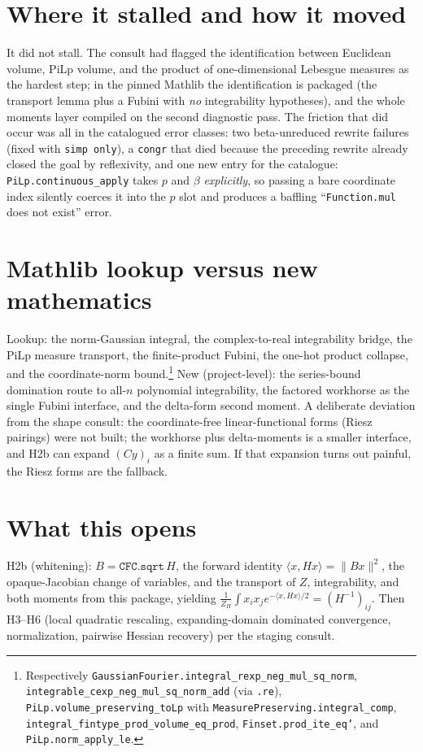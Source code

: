 \documentclass[11pt]{article}
\begin{document}
\section{Where it stalled and how it moved}

It did not stall. The consult had flagged the identification between
Euclidean volume, PiLp volume, and the product of one-dimensional
Lebesgue measures as the hardest step; in the pinned Mathlib the
identification is packaged (the transport lemma plus a Fubini with
\emph{no} integrability hypotheses), and the whole moments layer
compiled on the second diagnostic pass. The friction that did occur
was all in the catalogued error classes: two beta-unreduced rewrite
failures (fixed with \texttt{simp only}), a \texttt{congr} that died
because the preceding rewrite already closed the goal by
reflexivity, and one new entry for the catalogue:
\texttt{PiLp.continuous\_apply} takes $p$ and $\beta$
\emph{explicitly}, so passing a bare coordinate index silently
coerces it into the $p$ slot and produces a baffling
``\texttt{Function.mul} does not exist'' error.

\section{Mathlib lookup versus new mathematics}

Lookup: the norm-Gaussian integral, the complex-to-real integrability
bridge, the PiLp measure transport, the finite-product Fubini, the
one-hot product collapse, and the coordinate-norm
bound.\footnote{Respectively
\texttt{GaussianFourier.integral\_rexp\_neg\_mul\_sq\_norm},
\texttt{integrable\_cexp\_neg\_mul\_sq\_norm\_add} (via \texttt{.re}),
\texttt{PiLp.volume\_preserving\_toLp} with
\texttt{MeasurePreserving.integral\_comp},
\texttt{integral\_fintype\_prod\_volume\_eq\_prod},
\texttt{Finset.prod\_ite\_eq'}, and \texttt{PiLp.norm\_apply\_le}.}
New (project-level): the series-bound
domination route to all-$n$ polynomial integrability, the factored
workhorse as the single Fubini interface, and the delta-form second
moment. A deliberate deviation from the shape consult: the
coordinate-free linear-functional forms (Riesz pairings) were not
built; the workhorse plus delta-moments is a smaller interface, and
H2b can expand $(Cy)_i$ as a finite sum. If that expansion turns out
painful, the Riesz forms are the fallback.

\section{What this opens}

H2b (whitening): $B = \texttt{CFC.sqrt}\,H$, the forward identity
$\langle x, Hx\rangle = \|Bx\|^2$, the opaque-Jacobian change of
variables, and the transport of $Z$, integrability, and both moments
from this package, yielding
$\frac{1}{Z_H}\int x_i x_j e^{-\langle x,Hx\rangle/2} = (H^{-1})_{ij}$.
Then H3--H6 (local quadratic rescaling, expanding-domain dominated
convergence, normalization, pairwise Hessian recovery) per the
staging consult.
\end{document}
